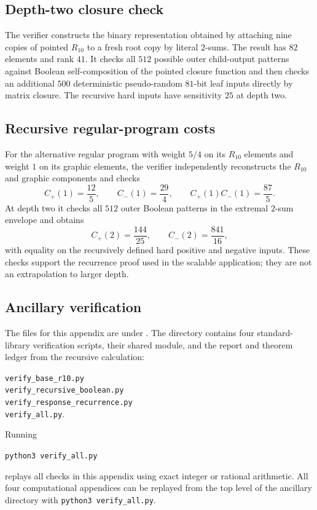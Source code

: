 \documentclass[11pt]{article}
\numberwithin{equation}{section}
\theoremstyle{remark}
\begin{document}
\subsection{Depth-two closure check}
\label{app:r10-recursive-boolean}

The verifier constructs the binary representation obtained by attaching nine
copies of pointed $R_{10}$ to a fresh root copy by literal $2$-sums. The
result has $82$ elements and rank $41$. It checks all $512$ possible outer
child-output patterns against Boolean self-composition of the pointed
closure function and then checks an additional $500$ deterministic
pseudo-random $81$-bit leaf inputs directly by matrix closure. The recursive
hard inputs have sensitivity $25$ at depth two.

\subsection{Recursive regular-program costs}
\label{app:r10-recursive-program}

For the alternative regular program with weight $5/4$ on its $R_{10}$
elements and weight $1$ on its graphic elements,
the verifier independently reconstructs the $R_{10}$ and graphic components
and checks
\begin{equation}
    C_+(1)=\frac{12}{5},
    \qquad
    C_-(1)=\frac{29}{4},
    \qquad
    C_+(1)C_-(1)=\frac{87}{5}.
\end{equation}
At depth two it checks all $512$ outer Boolean patterns in the extremal
$2$-sum envelope and obtains
\begin{equation}
    C_+(2)=\frac{144}{25},
    \qquad
    C_-(2)=\frac{841}{16},
    \label{eq:r10-recursive-depth-two-costs}
\end{equation}
with equality on the recursively defined hard positive and negative inputs.
These checks support the recurrence proof used in the scalable application;
they are not an extrapolation to larger depth.

\subsection{Ancillary verification}
\label{app:r10-recursive-ancillary}

The files for this appendix are under
. The directory contains four
standard-library verification scripts, their shared module, and the report
and theorem ledger from the recursive calculation:
\begin{center}
\small
\texttt{verify\_base\_r10.py}\\
\texttt{verify\_recursive\_boolean.py}\\
\texttt{verify\_response\_recurrence.py}\\
\texttt{verify\_all.py}.
\end{center}
Running
\begin{center}
\texttt{python3 verify\_all.py}
\end{center}
replays all checks in this appendix using exact integer or rational
arithmetic. All four computational appendices can be replayed from the top
level of the ancillary directory with \texttt{python3 verify\_all.py}.
\end{document}
